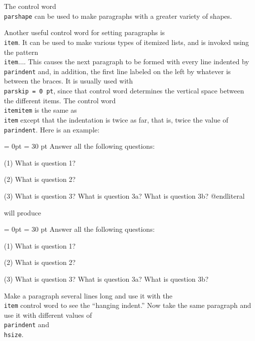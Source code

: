  \hangindent=-1.75in \hangparagraph 


The control word {\tt \\parshape} can be used to make paragraphs with 
a greater variety of shapes. 

Another useful control word for setting paragraphs is {\tt \\item}. 
It can be used to make various types of itemized lists, 
and is invoked using the pattern {\tt \\item\lb$\ldots$\rb}\null. 
This causes the next  paragraph to be formed with every line 
indented by {\tt \\parindent} and, in addition, the first line 
labeled on the left by whatever is between the braces.  It is 
usually used with {\tt \\parskip = 0 pt}, since that control word 
determines the vertical space between the different items. The control 
word {\tt \\itemitem} is the same as {\tt \\item} except that the 
indentation is twice as far, that is, twice the value of 
{\tt \\parindent}. 
Here is an example: 

\beginliteral 
\parskip = 0pt \parindent = 30 pt 
\noindent 
Answer all the following questions: 
\beginlist
\beginlist
\item{(1)} What is question 1? 
\item{(2)} What is question 2? 
\item{(3)} What is question 3? 
 What is question 3a? 
 What is question 3b? 
\endlist
\endlist
@endliteral 


\noindent 
will produce 
\vfill\eject 

{\parskip = 0pt \parindent = 30 pt 
\noindent 
Answer all the following questions: 
\beginlist
\beginlist
\item{(1)} What is question 1? 
\item{(2)} What is question 2? 
\item{(3)} What is question 3? 
 What is question 3a? 
 What is question 3b? 
\endlist
\endlist

} 

\exercise Make a paragraph several lines long and use it with 
the {\tt \\item} control word to see the ``hanging indent.'' Now 
take the same paragraph and use it with different values of {\tt 
\\parindent} and {\tt \\hsize}. 
\bigskip 

